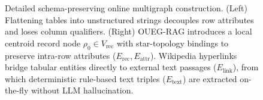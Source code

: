 \begin{figure}[t]
\centering
\resizebox{\linewidth}{!}{}
\vspace{-2mm}
\caption{Detailed schema-preserving online multigraph construction. (Left) Flattening tables into unstructured strings decouples row attributes and loses column qualifiers. (Right) OUEG-RAG introduces a local centroid record node $\rho_0 \in V_{\text{rec}}$ with star-topology bindings to preserve intra-row attributes ($E_{\text{rec}}, E_{\text{attr}}$). Wikipedia hyperlinks bridge tabular entities directly to external text passages ($E_{\text{link}}$), from which deterministic rule-based text triples ($E_{\text{text}}$) are extracted on-the-fly without LLM hallucination.}
\vspace{-2mm}
\label{fig:kg-construction}
\end{figure}
